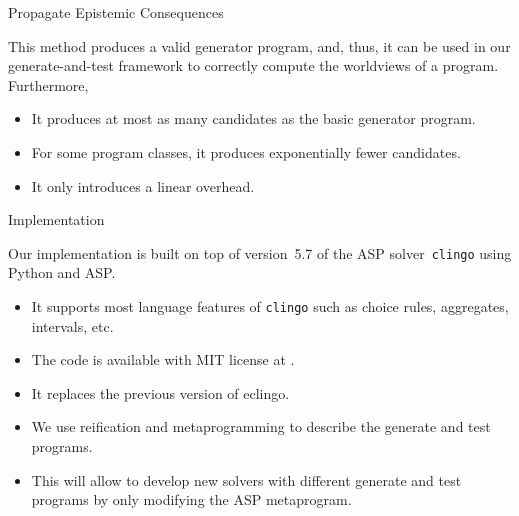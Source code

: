 \documentclass[aspectratio=169,svgnames,xcolor=table,t]{beamer}
\begin{document}
\begin{frame}[c]{Propagate Epistemic Consequences}
    \begin{theorem}
        This method produces a valid generator program, and, thus, it can be used in our generate-and-test framework to correctly compute the worldviews of a program.
        \\
        Furthermore,
        \begin{itemize}
            \item It produces at most as many candidates as the basic generator program.
            \item For some program classes, it produces exponentially fewer candidates.
            \item It only introduces a linear overhead.
        \end{itemize}
    \end{theorem}
\end{frame}
\begin{frame}{Implementation}
    \begin{myitemize}
        \item Our implementation is built on top of version~5.7 of the ASP solver~\texttt{clingo} using Python and ASP.
        \begin{itemize}
            \item It supports most language features of \texttt{clingo} such as choice rules, aggregates, intervals, etc.
            
            \item The code is available with MIT license at .
            
            \item It replaces the previous version of eclingo.
                        
            \item We use reification and metaprogramming to describe the generate and test programs.
            
            \item This will allow to develop new solvers with different generate and test programs by only modifying the ASP metaprogram.
        \end{itemize}
    \end{myitemize}
\end{frame}
\end{document}
